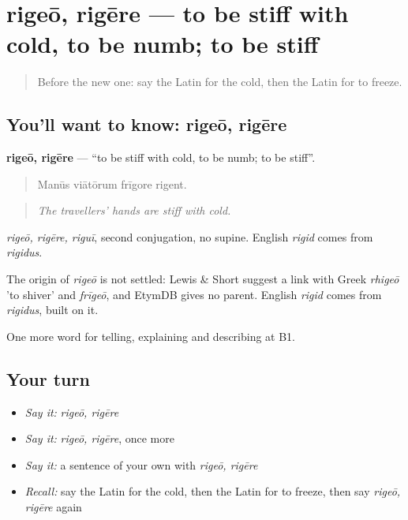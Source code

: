 \section[rigeō, rigēre]{rigeō, rigēre — to be stiff with cold, to be numb; to be stiff}

\label{lesson:LA-C486-rigeo}



\begin{quote}
Before the new one: say the Latin for the cold, then the Latin for to freeze.
\end{quote}

\subsection*{You'll want to know: rigeō, rigēre}
\textbf{rigeō, rigēre} — \textquotedblleft{}to be stiff with cold, to be numb; to be stiff\textquotedblright{}.

\begin{quote}
Manūs viātōrum frīgore rigent.
\end{quote}

\begin{quote}
\emph{The travellers' hands are stiff with cold.}
\end{quote}

\emph{rigeō, rigēre, riguī}, second conjugation, no supine. English \emph{rigid} comes from \emph{rigidus}.

\begin{cousinweb}
The origin of \emph{rigeō} is not settled: Lewis \& Short suggest a link with Greek \emph{rhigeō} 'to shiver' and \emph{frīgeō}, and EtymDB gives no parent. English \emph{rigid} comes from \emph{rigidus}, built on it.
\end{cousinweb}

\begin{grammarlens}[title={What you've built}]
One more word for telling, explaining and describing at B1.
\end{grammarlens}

\subsection*{Your turn}
\begin{itemize}
\raggedright
  \item \emph{Say it:} \emph{rigeō, rigēre}
  \item \emph{Say it:} \emph{rigeō, rigēre}, once more
  \item \emph{Say it:} a sentence of your own with \emph{rigeō, rigēre}
  \item \emph{Recall:} say the Latin for the cold, then the Latin for to freeze, then say \emph{rigeō, rigēre} again
\end{itemize}

